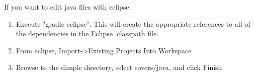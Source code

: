If you want to edit java files with eclipse:

\begin{enumerate}
\item Execute "gradle eclipse".  This will create the appropriate references to all of the dependencies in the Eclipse .classpath file.
\item From eclipse, Import-\textgreater Existing Projects Into Workspace
\item Browse to the dimple directory, select sovers/java, and click Finish.
\end{enumerate}

